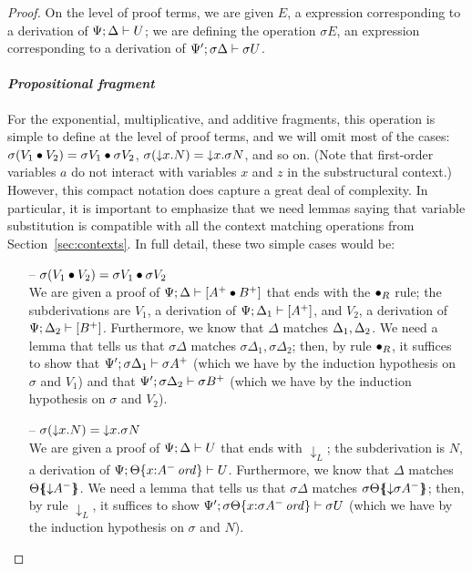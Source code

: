 \begin{proof}
On the level of proof terms, 
we are given $E$, a expression corresponding to a derivation of
${\Psi};{\Delta} \vdash {U}$; we are defining the operation $\sigma{E}$,
an expression corresponding to a derivation of 
${\Psi'};{\sigma\Delta} \vdash {\sigma{U}}$.

\paragraph{\it Propositional fragment}
For the exponential, multiplicative, and additive fragments, this
operation is simple to define at the level of proof terms, and we will
omit most of the cases: $\sigma({V_1} \mathbin{\bullet} {V_2}) =
{\sigma{V_1}} \mathbin{\bullet} {\sigma{V_2}}$, $\sigma({\downarrow}{x}.{N}) =
{\downarrow}{x}.{\sigma N}$, and so on. (Note that first-order variables
$a$ do not interact with variables $x$ and $z$ in the substructural
context.) However, this compact notation does
capture a great deal of complexity. In particular, it is important to
emphasize that we need lemmas saying that variable substitution is
compatible with all the context matching operations from
Section~\ref{sec:contexts}.  In full detail, these two simple cases
would be:

\begin{itemize}

\item[--]
$\sigma({V_1} \mathbin{\bullet} {V_2}) = {\sigma{V_1}} \mathbin{\bullet} {\sigma{V_2}}$\smallskip\\
We are given a proof of ${\Psi};{\Delta} \vdash {[A^+ \mathbin{\bullet}B^+]}$ that
ends with the ${\mathbin{\bullet}}_R$ rule; the subderivations are
$V_1$, a derivation of ${\Psi};{\Delta_1} \vdash {[A^+]}$, and
$V_2$, a derivation of ${\Psi};{\Delta_2} \vdash {[B^+]}$. Furthermore, we know that
$\Delta$ matches ${\Delta_1},{\Delta_2}$. We need a lemma that
tells us that $\sigma\Delta$ matches $\sigma\Delta_1, \sigma\Delta_2$;
then, by rule ${\mathbin{\bullet}}_R$, it suffices to show that
${\Psi'};{\sigma\Delta_1} \vdash {\sigma{A^+}}$ (which we have by the 
induction hypothesis on $\sigma$ and $V_1$) and that
${\Psi'};{\sigma\Delta_2} \vdash {\sigma{B^+}}$ 
(which we have by the induction hypothesis
on $\sigma$ and $V_2$). \smallskip

\item[--]
$\sigma({\downarrow}{x}.{N}) = {\downarrow}{x}.{\sigma N}$ \smallskip\\ 
We are given a proof
of ${\Psi};{\Delta} \vdash {U}$ that ends with ${\downarrow}_L$; 
the subderivation is $N$, a derivation of
${\Psi};{{\Theta}\{{x{:}{A^-}\,{{\it ord}}}\}} \vdash {U}$. Furthermore, we know that
$\Delta$ matches ${\Theta}\mbox{$\{\hspace{-4pt}\{$}{{\downarrow}A^-}\mbox{$\}\hspace{-4pt}\}$}$. We need a lemma
that tells us that $\sigma\Delta$ matches
${\sigma\Theta}\mbox{$\{\hspace{-4pt}\{$}{{\downarrow}\sigma A^-}\mbox{$\}\hspace{-4pt}\}$}$; then, by 
rule ${\downarrow}_L$, it suffices to show 
${\Psi'};{{\sigma\Theta}\{{x{:}{\sigma{A^-}}\,{{\it ord}}}\}} \vdash {\sigma{U}}$ 
(which we have by the induction hypothesis on $\sigma$ and $N$).


\end{itemize}
\end{proof}
